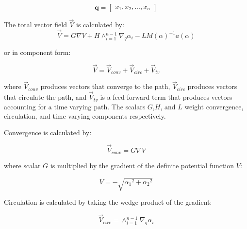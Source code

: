 \documentclass[numbered,pdftex]{ohio-etd}
\begin{document}


\begin{equation}
\mathbf{q} = \begin{bmatrix} x_1, x_2, ..., x_{n}\end{bmatrix}
\end{equation}

\noindent
The total vector field $\overrightarrow{V}$ is calculated by:
\begin{equation}\label{eq:GVF}
\overrightarrow{V} = G \nabla V + H \wedge_{i=1}^{n-1}\nabla_q\alpha_i  - LM(\alpha)^{-1} a(\alpha)
\end{equation}

\noindent
or in component form:

\begin{equation}\label{simpleGVF}
\overrightarrow{V} = \overrightarrow{V}_{conv} + \overrightarrow{V}_{circ} + \overrightarrow{V}_{tv} 
\end{equation}	

\noindent
where $\overrightarrow{V}_{conv}$ produces vectors that converge to the path, $\overrightarrow{V}_{circ}$ produces vectors that circulate the path, and $\overrightarrow{V}_{tv}$ is a feed-forward term that produces vectors accounting for a time varying path. The scalars $G$,$H$, and $L$ weight convergence, circulation, and time varying components respectively. 

\noindent
Convergence is calculated by:

\begin{equation}
\overrightarrow{V}_{conv} = G \nabla V  
\label{convOnly}
\end{equation}

\noindent
where scalar $G$ is multiplied by the gradient of the definite potential function $V$:

\begin{equation}
\label{potentialV}
V = -\sqrt{{\alpha_1}^2 + {\alpha_2}^2}
\end{equation}


\noindent
Circulation is calculated by taking the wedge product of the gradient:

\begin{equation}
\overrightarrow{V}_{circ} =  \wedge_{i=1}^{n-1}\nabla_q\alpha_i 
\label{circOnly}
\end{equation}
\end{document}

